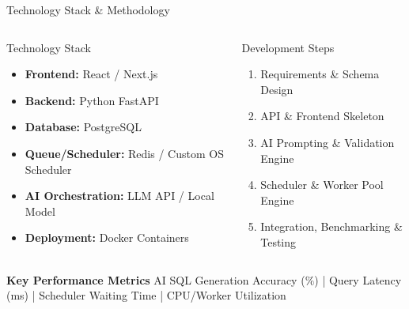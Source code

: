 \documentclass[aspectratio=169,11pt]{beamer}
\begin{document}

\begin{frame}{Technology Stack \& Methodology}

\begin{columns}[T,totalwidth=\textwidth]

\begin{block}{Technology Stack}
\scriptsize
\begin{itemize}\itemsep1pt
\item \textbf{Frontend:} React / Next.js
\item \textbf{Backend:} Python FastAPI
\item \textbf{Database:} PostgreSQL
\item \textbf{Queue/Scheduler:} Redis / Custom OS Scheduler
\item \textbf{AI Orchestration:} LLM API / Local Model
\item \textbf{Deployment:} Docker Containers
\end{itemize}
\end{block}

\begin{block}{Development Steps}
\scriptsize
\begin{enumerate}\itemsep1pt
\item Requirements \& Schema Design
\item API \& Frontend Skeleton
\item AI Prompting \& Validation Engine
\item Scheduler \& Worker Pool Engine
\item Integration, Benchmarking \& Testing
\end{enumerate}
\end{block}

\end{columns}

\vspace{1mm}
\textbf{\color{GEUBlue}\small Key Performance Metrics}
\scriptsize
AI SQL Generation Accuracy ($\%$) | Query Latency (ms) | Scheduler Waiting Time | CPU/Worker Utilization

\end{frame}


\end{document}
